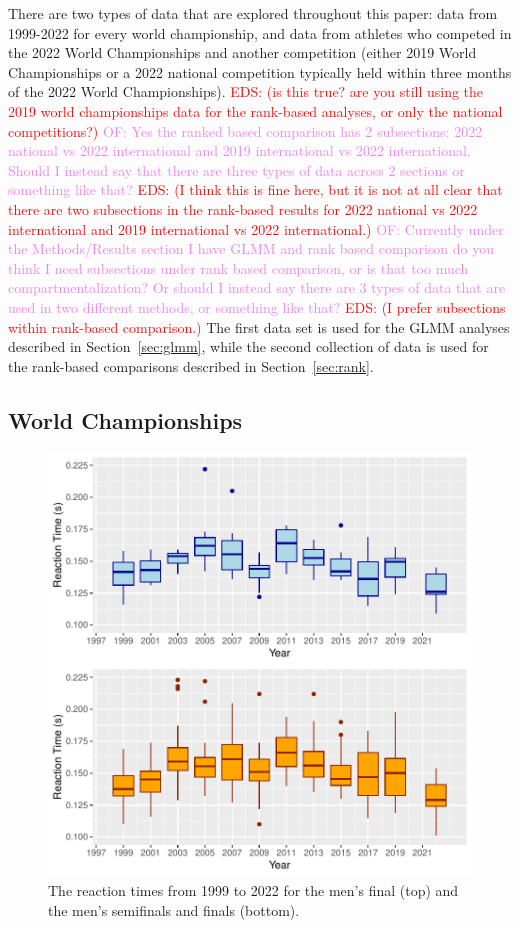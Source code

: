 \documentclass[12pt, letterpaper, titlepage]{article}
\newcommand{\eds}[1]{\textcolor{red}{EDS: (#1)}}
\newcommand{\of}[1]{\textcolor{violet}{OF: #1}}
\begin{document}
There are two types of data that are explored throughout this paper: data from
1999-2022 for every world championship, and data from athletes who competed in
the 2022 World Championships and another competition (either 2019 World 
Championships or a 2022 national competition typically held within three months 
of the 2022 World Championships). 
\eds{is this true? are you still using the 2019 world championships data for the
rank-based analyses, or only the national competitions?}
\of{Yes the ranked based comparison has 2 subsections: 2022 national vs 2022
international and 2019 international vs 2022 international.  Should I instead say
that there are three types of data across 2 sections or something like that?}
\eds{I think this is fine here, but it is not at all clear that there are two
subsections in the rank-based results for 2022 national vs 2022
international and 2019 international vs 2022 international.}
\of{Currently under the Methods/Results section I have GLMM and rank based comparison
do you think I need subsections under rank based comparison, or is that too much
compartmentalization?  Or should I instead say there are 3 types of data that are
used in two different methods, or something like that?} \eds{I prefer
subsections within rank-based comparison.}
The first data set is used for the GLMM analyses described in 
Section~\ref{sec:glmm}, while the second collection of data is used for the 
rank-based comparisons described in Section~\ref{sec:rank}.

\subsection{World Championships}\label{sec:dataworld}


\begin{figure}[tbp]
  \centering
  \includegraphics{Finals_Pooled_Boxplot}
  \caption{The reaction times from 1999 to 2022 for the men's final (top) and
  the men's semifinals and finals (bottom).}
  \label{fig:Boxplots}
\end{figure}
\end{document}
